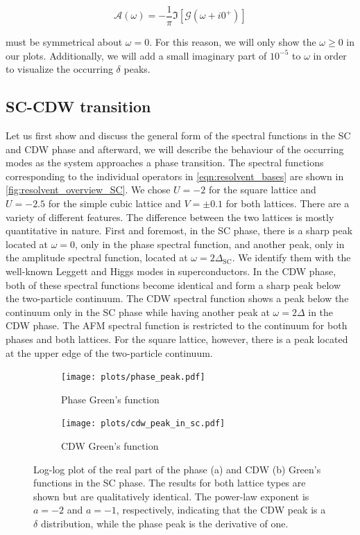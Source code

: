 \documentclass[
    reprint, 
    aps,
    preprintnumbers,
    twocolumn,
    prb,
    superscriptaddress
]{revtex4-2}
\begin{document}
\begin{equation}
    \mathcal{A}(\omega) = -\frac{1}{\pi} \Im \left[ \mathcal{G}(\omega + i0^+) \right]
\end{equation}

must be symmetrical about $\omega=0$.
For this reason, we will only show the $\omega \geq 0$ in our plots. 
Additionally, we will add a small imaginary part of $10^{-5}$ to $\omega$ in order to visualize the occurring $\delta$ peaks.

\subsection{SC-CDW transition}

Let us first show and discuss the general form of the spectral functions in the SC and CDW phase and afterward, 
we will describe the behaviour of the occurring modes as the system approaches a phase transition.
\newline
The spectral functions corresponding to the individual operators in \eqref{eqn:resolvent_bases} are shown in \autoref{fig:resolvent_overview_SC}.
We chose $U=-2$ for the square lattice and $U=-2.5$ for the simple cubic lattice and $V=\pm0.1$ for both lattices.
\newline
There are a variety of different features. The difference between the two lattices is mostly quantitative in nature.
First and foremost, in the SC phase, there is a sharp peak located at $\omega=0$, only in the phase spectral function,
and another peak, only in the amplitude spectral function, located at $\omega=2\Delta_\text{SC}$.
We identify them with the well-known Leggett and Higgs modes in superconductors.
In the CDW phase, both of these spectral functions become identical and form a sharp peak below the two-particle continuum.
\newline
The CDW spectral function shows a peak below the continuum only in the SC phase while having another peak at $\omega=2\Delta$ in the CDW phase.
The AFM spectral function is restricted to the continuum for both phases and both lattices.
For the square lattice, however, there is a peak located at the upper edge of the two-particle continuum.

\begin{figure}
    \centering
    \begin{subfigure}{0.48\textwidth}
        \texttt{[image: plots/phase\_peak.pdf]}
        \caption{Phase Green's function}
    \end{subfigure}
    \hfill
    \begin{subfigure}{0.48\textwidth}
        \texttt{[image: plots/cdw\_peak\_in\_sc.pdf]}
        \caption{CDW Green's function}
    \end{subfigure}
    \caption{Log-log plot of the real part of the phase (a) and CDW (b) Green's functions in the SC phase.
    The results for both lattice types are shown but are qualitatively identical.
    The power-law exponent is $a=-2$ and $a=-1$, respectively, indicating that the CDW peak is a $\delta$ distribution, while the phase peak is the derivative of one.}
    \label{fig:peaks_in_sc}
\end{figure}
\end{document}

